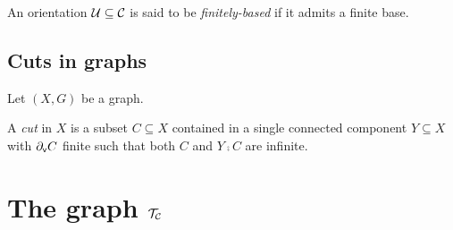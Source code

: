\documentclass{amsart}
\begin{document}
    \begin{definition}
        An orientation $\mathcal{U}\subseteq\mathcal{C}$ is said to be \textit{finitely-based} if it admits a finite base.
    \end{definition}

    \subsection{Cuts in graphs}

    Let $(X,G)$ be a graph.

    \begin{definition}
        A \textit{cut} in $X$ is a subset $C\subseteq X$ contained in a single connected component $Y\subseteq X$ with $\partial_\mathsf{v}C$ finite such that both $C$ and $Y\comp C$ are infinite.
    \end{definition}

    \begin{definition}
        
    \end{definition}

    \section{The graph $\mathcal{T}_{\mathcal{C}}$}
\end{document}
